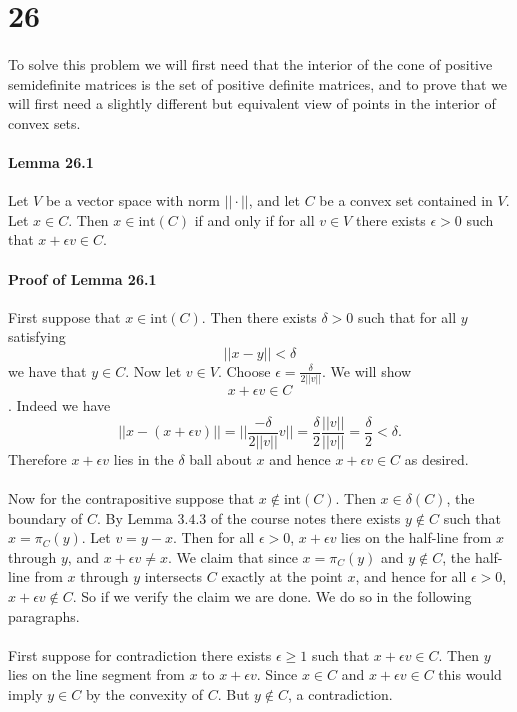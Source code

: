\documentclass[letterpaper,12pt,oneside,onecolumn]{article}
\begin{document}
\section*{26}
\paragraph{}
To solve this problem we will first need that the interior of the cone of positive semidefinite matrices is the set of positive definite matrices, and to prove that we will first need a slightly different but equivalent view of points in the interior of convex sets.
\paragraph{Lemma 26.1}
Let $V$ be a vector space with norm $|| \cdot ||$, and let $C$ be a convex set contained in $V$. Let $x \in C$. Then $x \in \text{int}(C)$ if and only if for all $v \in V$ there exists $\epsilon >0$ such that $x + \epsilon v \in C$.
\paragraph{Proof of Lemma 26.1}
First suppose that $x \in \text{int}(C)$. Then there exists $\delta > 0$ such that for all $y$ satisfying $$|| x - y|| < \delta$$ we have that $y \in C$. Now let $v \in V$. Choose $\epsilon = \frac{\delta}{2 ||v||}$. We will show $$x + \epsilon v \in C$$. Indeed we have $$|| x - (x+\epsilon v)|| = || \frac{-\delta}{2||v||} v|| = \frac{\delta}{2}\frac{||v||}{||v||} = \frac{\delta}{2} < \delta.$$
Therefore $x +\epsilon v$ lies in the $\delta$ ball about $x$ and hence $x+\epsilon v \in C$ as desired.
\paragraph{}
Now for the contrapositive suppose that $x \not\in \text{int}(C)$. Then $x \in \delta(C)$, the boundary of $C$. By Lemma $3.4.3$ of the course notes there exists $y \not\in C$ such that $x = \pi_C(y)$. Let $v = y - x$. Then for all $\epsilon > 0$, $x + \epsilon v$ lies on the half-line from $x$ through $y$, and $x + \epsilon v \neq x$. We claim that since $x =\pi_C(y)$ and $y \not \in C$, the half-line from $x$ through $y$ intersects $C$ exactly at the point $x$, and hence for all $\epsilon > 0$, $x+ \epsilon v \not \in C$. So if we verify the claim we are done. We do so in the following paragraphs.
\paragraph{}
First suppose for contradiction there exists $\epsilon \geq 1$ such that $x + \epsilon v \in C$. Then $y$ lies on the line segment from $x$ to $x + \epsilon v$. Since $x \in C$ and $x +\epsilon v \in C$ this would imply $y \in C$ by the convexity of $C$. But $y \not\in C$, a contradiction.
\end{document}
